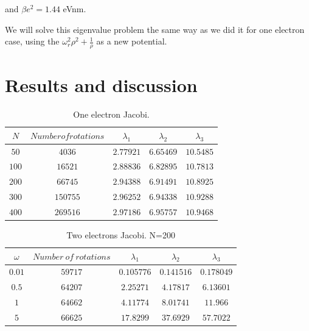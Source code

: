 \documentclass[10pt]{article}
\begin{document}
	and $\beta e^{2}=1.44$ eVnm.
	
	We will solve this eigenvalue problem the same way as we did it for one
	electron case, using the $\omega _{r}^{2}\rho ^{2}+\frac{1}{\rho }$ as a new
	potential.
\newpage
\section{Results and discussion}

\begin{table}
  \caption{One electron Jacobi.}
  \label{tab:one}
  \begin{center}
    \begin{tabular}{c|c|c|c|c}
    \hline
		$N$ & $Number of rotations$ & $\lambda_1$ & $\lambda_2$ & $\lambda_3$ \\
        \hline
	$	50 $  & $ 4036  $ & $2.77921$ & $6.65469$ & $10.5485$ \\
	$	100$  & $ 16521 $ & $2.88836$ & $6.82895$ & $10.7813$ \\
	$	200$  & $ 66745 $ & $2.94388$ & $6.91491$ & $10.8925$ \\
	$	300$  & $ 150755$ & $2.96252$ & $6.94338$ & $10.9288$ \\
	$	400$  & $ 269516$ & $2.97186$ & $6.95757$ & $10.9468$ \\

	\end{tabular}
  \end{center}
\end{table}

\begin{table}
  \caption{Two electrons Jacobi. N=200}
  \label{tab:two}
	\begin{center}
    \begin{tabular}{c|c|c|c|c}
    \hline
		$\omega$ & $Number\ of\ rotations$ & $\lambda_1$ & $\lambda_2$ & $\lambda_3$ \\
        \hline
		$0.01$ & $59717$ & $0.105776$ & $0.141516$  & $0.178049$ \\ 
		$0.5$  & $64207$ & $2.25271 $ & $4.17817 $  & $6.13601$ \\ 
		$1  $  & $64662$ & $4.11774 $ & $8.01741 $  & $11.966$ \\
		$5  $  & $66625$ & $17.8299 $ & $37.6929 $  & $57.7022$ \\

	\end{tabular}
  \end{center}
\end{table}
\end{document}
